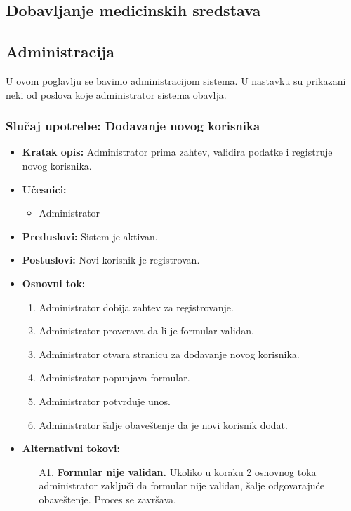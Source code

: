 \documentclass[titlepage]{article}
\begin{document}
\subsection{Dobavljanje medicinskih sredstava}

\subsection{Administracija}

U ovom poglavlju se bavimo administracijom sistema. U nastavku su prikazani neki od poslova koje administrator sistema obavlja.

\subsubsection{Slučaj upotrebe: Dodavanje novog korisnika}

\begin{itemize}
    \item \textbf{Kratak opis:} Administrator prima zahtev, validira podatke i registruje novog korisnika.
    \item \textbf{Učesnici:}
        \begin{itemize}
            \item Administrator
        \end{itemize}
    \item \textbf{Preduslovi:} Sistem je aktivan.
    \item \textbf{Postuslovi:} Novi korisnik je registrovan.
    \item \textbf{Osnovni tok:}
        \begin{enumerate}
            \item Administrator dobija zahtev za registrovanje.
            \item Administrator proverava da li je formular validan.
            \item Administrator otvara stranicu za dodavanje novog korisnika.
            \item Administrator popunjava formular.
            \item Administrator potvrđuje unos.
            \item Administrator šalje obaveštenje da je novi korisnik dodat.
        \end{enumerate}  
    
    \item \textbf{Alternativni tokovi:}
        \begin{itemize}
            \item[A1.] \textbf{Formular nije validan.} Ukoliko u koraku 2 osnovnog toka administrator zaključi da formular nije validan, šalje odgovarajuće obaveštenje. Proces se završava.
        \end{itemize}
\end{itemize}
\end{document}
